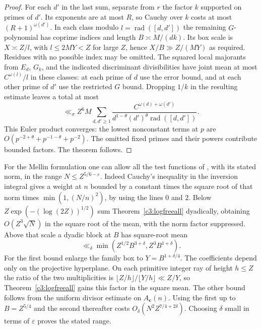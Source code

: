 \documentclass[11pt,letterpaper]{article}
\theoremstyle{definition}
\begin{document}
\begin{proof}
For each $d'$ in the last sum, separate from $r$ the factor $k$
supported on primes of $d'$. Its exponents are at most $R$, so
Cauchy over $k$ costs at most $(R+1)^{\omega(d')}$. In each class
modulo $l=\operatorname{rad}([d,d'])$ the remaining $G$-polynomial
has coprime indices and length $B\asymp M/(dk)$. Its box scale
is $X\asymp Z/l$, with $l\le 2MY<Z$ for large $Z$, hence $X/B\gg Z/(MY)$ as required. Residues
with no possible index may be omitted. The squared local
majorants from $E_d$, $G_k$, and the indicated discriminant
divisibilities have joint mean at most $C^{\omega(l)}/l$ in
these classes: at each prime of $d$ use the error bound, and
at each other prime of $d'$ use the restricted $G$ bound.
Dropping $1/k$ in the resulting estimate leaves a total at most
\[
 \ll_\sigma Z^6 M
  \sum_{d,d'\ge1}
   \frac{C^{\omega(d)+\omega(d')}}{
        d^{1-\theta}(d')^\theta\operatorname{rad}([d,d'])}.
\]
This Euler product converges: the lowest nonconstant terms at $p$
are $O(p^{-2+\theta}+p^{-1-\theta}+p^{-2})$. The omitted fixed
primes and their powers contribute bounded factors. The theorem
follows.
\end{proof}

For the Mellin formulation one can allow all the test functions of
\cite[Conjecture 6.4]{c3:wang}, with its stated norm, in the range
$N\le Z^{5/6-\varepsilon}$. Indeed Cauchy's inequality in the
inversion integral gives a weight at $n$ bounded by a constant
times the square root of that norm times $\min(1,(N/n)^2)$, by
using the lines $0$ and $2$. Below
$Z\exp(-(\log(2Z))^{1/2})$ sum Theorem~\ref{c3:logfreeall}
dyadically, obtaining $O(Z^3\sqrt N)$ in the square root of the
mean, with the norm factor suppressed. Above that scale a dyadic
block at $B$ has square-root mean
\[
 \ll_\delta \min(Z^{1/2}B^{3+\delta}, Z^3 B^{1+\delta}).
\]
For the first bound enlarge the family box to $Y=B^{1+\delta/4}$.
The coefficients depend only on the projective hyperplane. On
each primitive integer ray of height $h\le Z$ the ratio of the
two multiplicities is $\lfloor Z/h\rfloor/\lfloor Y/h\rfloor
\ll Z/Y$, so Theorem~\ref{c3:logfreeall} gains this factor in
the square mean. The other bound follows from the uniform divisor
estimate on $A_{\mathbf c}(n)$. Using the first up to $B=Z^{5/4}$
and the second thereafter costs
$O_\delta(N^2 Z^{7/4+2\delta})$. Choosing $\delta$ small in
terms of $\varepsilon$ proves the stated range.
\end{document}

